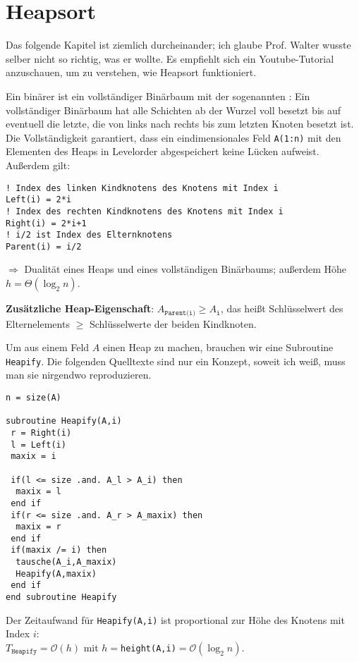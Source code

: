 \section{Heapsort}

\begin{*anmerkung}
	Das folgende Kapitel ist ziemlich durcheinander; ich glaube Prof. Walter wusste selber nicht so richtig, was er wollte. Es empfiehlt sich ein Youtube-Tutorial anzuschauen, um zu verstehen, wie Heapsort funktioniert.
\end{*anmerkung}

Ein binärer  ist ein vollständiger Binärbaum mit der sogenannten : Ein vollständiger Binärbaum hat alle Schichten ab der Wurzel voll besetzt bis auf eventuell die letzte, die von links nach rechts bis zum letzten Knoten besetzt ist. Die Vollständigkeit garantiert, dass ein eindimensionales Feld \texttt{A(1:n)} mit den Elementen des Heaps in Levelorder abgespeichert keine Lücken aufweist. Außerdem gilt:
\begin{lstlisting}
! Index des linken Kindknotens des Knotens mit Index i
Left(i) = 2*i
! Index des rechten Kindknotens des Knotens mit Index i
Right(i) = 2*i+1
! i/2 ist Index des Elternknotens
Parent(i) = i/2
\end{lstlisting}
$\Rightarrow$ Dualität eines Heaps und eines vollständigen Binärbaums; außerdem Höhe $h=\Theta(\log_2 n)$.

\textbf{Zusätzliche Heap-Eigenschaft}: $A_{\texttt{Parent(i)}} \ge A_\texttt{i}$, das heißt Schlüsselwert des Elternelements $\ge$ Schlüsselwerte der beiden Kindknoten.

Um aus einem Feld $A$ einen Heap zu machen, brauchen wir eine Subroutine \texttt{Heapify}. Die folgenden Quelltexte sind nur ein Konzept, soweit ich weiß, muss man sie nirgendwo reproduzieren.
\begin{lstlisting}
n = size(A)

subroutine Heapify(A,i)
 r = Right(i)
 l = Left(i)
 maxix = i
 
 if(l <= size .and. A_l > A_i) then
  maxix = l
 end if
 if(r <= size .and. A_r > A_maxix) then
  maxix = r
 end if
 if(maxix /= i) then
  tausche(A_i,A_maxix)
  Heapify(A,maxix)
 end if
end subroutine Heapify
\end{lstlisting}

Der Zeitaufwand für \texttt{Heapify(A,i)} ist proportional zur Höhe des Knotens mit Index $i$: \\
$T_\texttt{Heapify}=\mathcal{O}(h)$ mit $h=$\texttt{height(A,i)}$=\mathcal{O}(\log_2 n)$.

